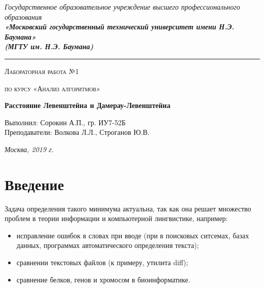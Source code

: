 \documentclass[14pt, a4paper]{report}
\begin{document}
    \begin{titlepage}

        \begin{center}
            \Large
            {\sl Государственное образовательное учреждение высшего профессионального образования\\
            {\bf«Московский государственный технический университет имени Н.Э. Баумана»\\
				(МГТУ им. Н.Э. Баумана)}}
				\noindent\rule{\textwidth}{2pt}
            \vspace{3cm}

			{\scshape\LARGE Лабораторная работа №1 \par}
			\vspace{0.5cm}	
			{\scshape\LARGE по курсу «Анализ алгоритмов» \par}
			\vspace{1.5cm}
			{\huge\bfseries Расстояние Левенштейна и Дамерау-Левенштейна \par}
			\vspace{2cm}
			\Large Выполнил: Сорокин А.П., гр. ИУ7-52Б\\
			\vspace{0.5cm}
			{\Large Преподаватели: Волкова Л.Л., Строганов Ю.В.}
		
			\vfill
			\Large \textit {Москва, 2019 г.}
            
        \end{center}

    \end{titlepage}
	
	\tableofcontents

	\chapter*{Введение}

	 Задача определения такого минимума актуальна, так как она решает множество проблем в теории информации и компьютерной лингвистике, например:

	\begin{itemize}
		\item исправление ошибок в словах при вводе (при в поисковых ситсемах, базах данных, программах автоматического определения текста);
		\item сравнении текстовых файлов (к примеру, утилита diff);
		\item сравнение белков, генов и хромосом в биоинформатике.
	\end{itemize}
\end{document}
